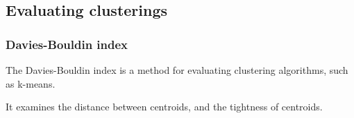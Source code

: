 
\subsection{Evaluating clusterings}
\subsubsection{Davies-Bouldin index}

The Davies-Bouldin index is a method for evaluating  clustering algorithms, such as k-means.

It examines the distance between centroids, and the tightness of centroids.

